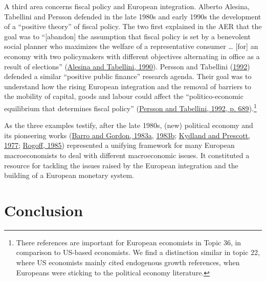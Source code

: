 \documentclass[
  12pt,
  onecolumn]{article}
\begin{document}
A third area concerns fiscal policy and European integration. Alberto
Alesina, Tabellini and Persson defended in the late 1980s and early
1990s the development of a ``positive theory'' of fiscal policy. The two
first explained in the AER that the goal was to ``{[}abandon{]} the
assumption that fiscal policy is set by a benevolent social planner who
maximizes the welfare of a representative consumer \ldots{} {[}for{]} an
economy with two policymakers with different objectives alternating in
office as a result of elections''
(\protect\hyperlink{ref-alesina1990}{Alesina and Tabellini, 1990}).
Persson and Tabellini (\protect\hyperlink{ref-persson1992}{1992})
defended a similar ``positive public finance'' research agenda. Their
goal was to understand how the rising European integration and the
removal of barriers to the mobility of capital, goods and labour could
affect the ``politico-economic equilibrium that determines fiscal
policy'' (\protect\hyperlink{ref-persson1992}{Persson and Tabellini,
1992, p. 689}).\footnote{There references are important for European
  economists in Topic 36, in comparison to US-based economists. We find
  a distinction similar in topic 22, where US economists mainly cited
  endogenous growth references, when Europeans were sticking to the
  political economy literature.}

As the three examples testify, after the late 1980s, (new) political
economy and its pioneering works
(\protect\hyperlink{ref-barro1983}{Barro and Gordon, 1983a},
\protect\hyperlink{ref-barro1983c}{1983b};
\protect\hyperlink{ref-kydland1977}{Kydland and Prescott, 1977};
\protect\hyperlink{ref-rogoff1985b}{Rogoff, 1985}) represented a
unifying framework for many European macroeconomists to deal with
different macroeconomic issues. It constituted a resource for tackling
the issues raised by the European integration and the building of a
European monetary system.

\hypertarget{conclusion}{%
\section*{Conclusion}\label{conclusion}}
\end{document}

